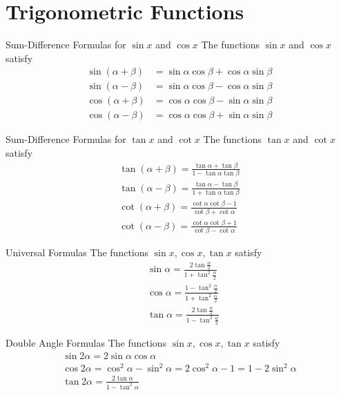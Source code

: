 
\section{Trigonometric Functions}

\begin{proposition}{Sum-Difference Formulas for $\sin x$ and $\cos x$}{}
  The functions $\sin x$ and $\cos x$ satisfy
  \begin{align}
    \sin(\alpha+\beta) &= \sin\alpha\cos\beta + \cos\alpha\sin\beta \\
    \sin(\alpha-\beta) &= \sin\alpha\cos\beta - \cos\alpha\sin\beta \\
    \cos(\alpha+\beta) &= \cos\alpha\cos\beta - \sin\alpha\sin\beta \\
    \cos(\alpha-\beta) &= \cos\alpha\cos\beta + \sin\alpha\sin\beta
  \end{align}
\end{proposition}

\begin{proposition}{Sum-Difference Formulas for $\tan x$ and $\cot x$}{}
  The functions $\tan x$ and $\cot x$ satisfy
  \begin{align}
    \tan (\alpha+\beta)=\frac{\tan \alpha+\tan \beta}{1-\tan \alpha \tan \beta} \\
    \tan (\alpha-\beta)=\frac{\tan \alpha-\tan \beta}{1+\tan \alpha \tan \beta} \\
    \cot (\alpha+\beta)=\frac{\cot \alpha \cot \beta-1}{\cot \beta+\cot \alpha} \\
    \cot (\alpha-\beta)=\frac{\cot \alpha \cot \beta+1}{\cot \beta-\cot \alpha}
  \end{align}
\end{proposition}

\begin{proposition}{Universal Formulas}{}
  The functions $\sin x, \cos x, \tan x$ satisfy
  \begin{align}
    &\sin \alpha=\frac{2 \tan \frac{\alpha}{2}}{1+\tan ^{2} \frac{\alpha}{2}} \\
    &\cos \alpha=\frac{1-\tan ^{2} \frac{\alpha}{2}}{1+\tan ^{2} \frac{\alpha}{2}} \\
    &\tan \alpha=\frac{2 \tan \frac{\alpha}{2}}{1-\tan ^{2} \frac{\alpha}{2}}
  \end{align}
\end{proposition}

\begin{proposition}{Double Angle Formulas}{}
  The functions $\sin x, \cos x, \tan x$ satisfy
  \begin{gather}
    \sin 2\alpha = 2 \sin \alpha \cos \alpha\\
    \cos 2\alpha = \cos^2 \alpha - \sin^2 \alpha = 2 \cos ^2\alpha - 1 = 1 - 2\sin^2 \alpha\\
    \tan 2\alpha = \frac{2 \tan \alpha}{1 - \tan^2 \alpha}
  \end{gather}
\end{proposition}

